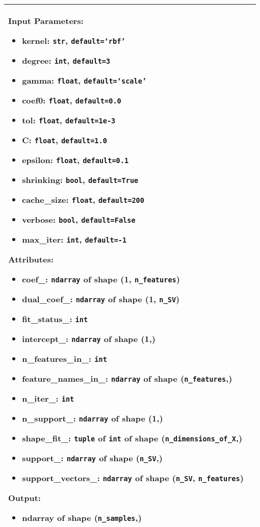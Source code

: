 \begin{longtable}{|l|p{12cm}|}
    Input Parameters:
    \begin{itemize}
        \item \textbf{kernel}: \texttt{str}, \texttt{default=`rbf'}
        \item \textbf{degree}: \texttt{int}, \texttt{default=3}
        \item \textbf{gamma}: \texttt{float}, \texttt{default=`scale'}
        \item \textbf{coef0}: \texttt{float}, \texttt{default=0.0}
        \item \textbf{tol}: \texttt{float}, \texttt{default=1e-3}
        \item \textbf{C}: \texttt{float}, \texttt{default=1.0}
        \item \textbf{epsilon}: \texttt{float}, \texttt{default=0.1}
        \item \textbf{shrinking}: \texttt{bool}, \texttt{default=True}
        \item \textbf{cache\_size}: \texttt{float}, \texttt{default=200}
        \item \textbf{verbose}: \texttt{bool}, \texttt{default=False}
        \item \textbf{max\_iter}: \texttt{int}, \texttt{default=-1}
    \end{itemize}

    Attributes:
    \begin{itemize}
        \item \textbf{coef\_}: \texttt{ndarray} of shape (1, \texttt{n\_features})
        \item \textbf{dual\_coef\_}: \texttt{ndarray} of shape (1, \texttt{n\_SV})
        \item \textbf{fit\_status\_}: \texttt{int}
        \item \textbf{intercept\_}: \texttt{ndarray} of shape (1,)
        \item \textbf{n\_features\_in\_}: \texttt{int}
        \item \textbf{feature\_names\_in\_}: \texttt{ndarray} of shape (\texttt{n\_features},)
        \item \textbf{n\_iter\_}: \texttt{int}
        \item \textbf{n\_support\_}: \texttt{ndarray} of shape (1,)
        \item \textbf{shape\_fit\_}: \texttt{tuple} of \texttt{int} of shape (\texttt{n\_dimensions\_of\_X},)
        \item \textbf{support\_}: \texttt{ndarray} of shape (\texttt{n\_SV},)
        \item \textbf{support\_vectors\_}: \texttt{ndarray} of shape (\texttt{n\_SV}, \texttt{n\_features})
    \end{itemize}

    Output:
    \begin{itemize}
        \item \textbf{ndarray} of shape (\texttt{n\_samples},)
    \end{itemize}
    \\ \hline
\end{longtable}

\clearpage